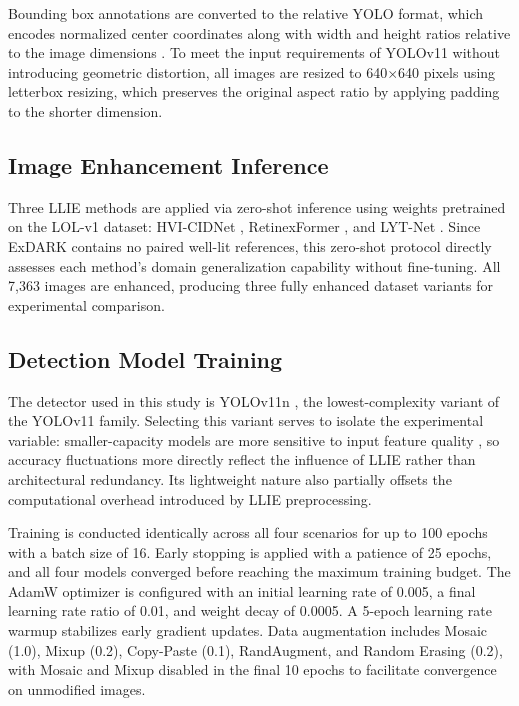 \documentclass[conference]{IEEEtran}
\begin{document}
Bounding box annotations are converted to the relative YOLO format, which encodes normalized center coordinates along with width and height ratios relative to the image dimensions \cite{padilla2021metrics,lin2014coco}. To meet the input requirements of YOLOv11 without introducing geometric distortion, all images are resized to 640$\times$640 pixels using letterbox resizing, which preserves the original aspect ratio by applying padding to the shorter dimension.

\subsection{Image Enhancement Inference}
Three LLIE methods are applied via zero-shot inference using weights pretrained on the LOL-v1 dataset: HVI-CIDNet \cite{yan2025hvi,hvicidnet2025}, RetinexFormer \cite{cai2023retinexformer,retinexformer2023}, and LYT-Net \cite{brateanu2025lytnet,lytnets2024}. Since ExDARK contains no paired well-lit references, this zero-shot protocol directly assesses each method's domain generalization capability without fine-tuning. All 7{,}363 images are enhanced, producing three fully enhanced dataset variants for experimental comparison.

\subsection{Detection Model Training}
The detector used in this study is YOLOv11n \cite{khanam2024yolov11}, the lowest-complexity variant of the YOLOv11 family. Selecting this variant serves to isolate the experimental variable: smaller-capacity models are more sensitive to input feature quality \cite{dobrzycki2025freezing}, so accuracy fluctuations more directly reflect the influence of LLIE rather than architectural redundancy. Its lightweight nature also partially offsets the computational overhead introduced by LLIE preprocessing.

Training is conducted identically across all four scenarios for up to 100 epochs with a batch size of 16. Early stopping is applied with a patience of 25 epochs, and all four models converged before reaching the maximum training budget. The AdamW optimizer \cite{loshchilov2017sgdr} is configured with an initial learning rate of 0.005, a final learning rate ratio of 0.01, and weight decay of 0.0005. A 5-epoch learning rate warmup stabilizes early gradient updates. Data augmentation includes Mosaic (1.0), Mixup (0.2), Copy-Paste (0.1), RandAugment, and Random Erasing (0.2), with Mosaic and Mixup disabled in the final 10 epochs to facilitate convergence on unmodified images.
\end{document}
